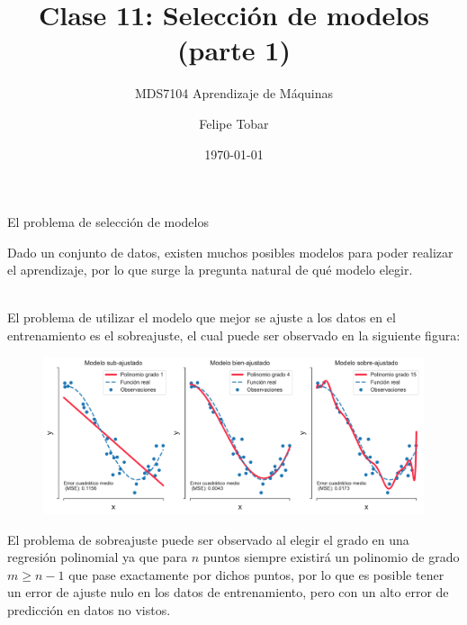 \documentclass[9pt, handout]{beamer}
\title{Clase 11: Selección de modelos (parte 1)}
\subtitle{MDS7104 Aprendizaje de Máquinas}
\date{\today}
\author{Felipe Tobar}
\institute{Iniciativa de Datos e Inteligencia Artificial\\Universidad de Chile}
\begin{document}
\begin{frame}
  \titlepage
\end{frame}

\begin{frame}{El problema de selección de modelos}

Dado un conjunto de datos, existen muchos posibles modelos para poder realizar el aprendizaje, por lo que surge la pregunta natural de qué modelo elegir. \\~\ \pause

El problema de utilizar el modelo que mejor se ajuste a los datos en el entrenamiento es el sobreajuste, el cual puede ser observado en la siguiente figura:
\begin{figure}[h!]
    \centering
    \includegraphics[width = 0.8\linewidth]{../../img/cap4_ajuste.pdf}
\end{figure}\pause

El problema de sobreajuste puede ser observado al elegir el grado en una regresión polinomial ya que para $n$ puntos siempre existirá un polinomio de grado $m \geq n -1$ que pase exactamente por dichos puntos, por lo que es posible tener un error de ajuste nulo en los datos de entrenamiento, pero con un alto error de predicción en datos no vistos.

\end{frame}
\end{document}
